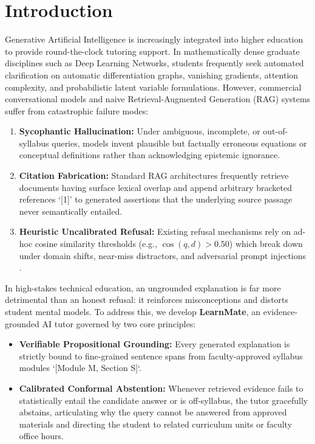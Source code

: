 \documentclass[10pt,twocolumn,letterpaper]{article}
\begin{document}
\section{Introduction}
Generative Artificial Intelligence is increasingly integrated into higher education to provide round-the-clock tutoring support. In mathematically dense graduate disciplines such as Deep Learning Networks, students frequently seek automated clarification on automatic differentiation graphs, vanishing gradients, attention complexity, and probabilistic latent variable formulations. However, commercial conversational models and naive Retrieval-Augmented Generation (RAG) systems \cite{lewis2020rag, gao2024rag_survey} suffer from catastrophic failure modes:
\begin{enumerate}
    \item \textbf{Sycophantic Hallucination:} Under ambiguous, incomplete, or out-of-syllabus queries, models invent plausible but factually erroneous equations or conceptual definitions rather than acknowledging epistemic ignorance.
    \item \textbf{Citation Fabrication:} Standard RAG architectures frequently retrieve documents having surface lexical overlap and append arbitrary bracketed references `[1]' to generated assertions that the underlying source passage never semantically entailed.
    \item \textbf{Heuristic Uncalibrated Refusal:} Existing refusal mechanisms rely on ad-hoc cosine similarity thresholds (e.g., $\cos(q, d) > 0.50$) which break down under domain shifts, near-miss distractors, and adversarial prompt injections \cite{ren2024investigating, xiong2024uncertainty}.
\end{enumerate}

In high-stakes technical education, an ungrounded explanation is far more detrimental than an honest refusal: it reinforces misconceptions and distorts student mental models. To address this, we develop \textbf{LearnMate}, an evidence-grounded AI tutor governed by two core principles:
\begin{itemize}
    \item \textbf{Verifiable Propositional Grounding:} Every generated explanation is strictly bound to fine-grained sentence spans from faculty-approved syllabus modules `[Module M, Section S]`.
    \item \textbf{Calibrated Conformal Abstention:} Whenever retrieved evidence fails to statistically entail the candidate answer or is off-syllabus, the tutor gracefully abstains, articulating why the query cannot be answered from approved materials and directing the student to related curriculum units or faculty office hours.
\end{itemize}
\end{document}
